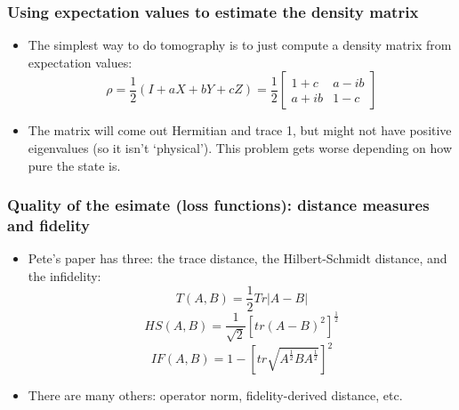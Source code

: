 \documentclass{beamer}
\begin{document}
\begin{frame}
  \frametitle{Using expectation values to estimate the density matrix}
  \begin{itemize}
  \item {The simplest way to do tomography is to just compute a density matrix from expectation values:
    \begin{equation}
      \rho = \frac{1}{2} (I + aX + bY + cZ) = \frac{1}{2}\begin{bmatrix} 1 + c & a - ib \\ a + ib & 1 -c\end{bmatrix}    
    \end{equation}
  }
\item The matrix will come out Hermitian and trace 1, but might not have positive eigenvalues (so it isn't `physical'). This problem gets worse depending on how pure the state is.
  \end{itemize}
\end{frame}

\begin{frame}
  \frametitle{Quality of the esimate (loss functions): distance measures and fidelity}
  \begin{itemize}
  \item{
      Pete's paper has three: the trace distance, the Hilbert-Schmidt distance, and the infidelity:
      \begin{equation}T(A,B) = \frac{1}{2} Tr|A - B|\end{equation}
      \begin{equation}HS(A,B) = \frac{1}{\sqrt{2}} \left[tr(A - B)^2\right]^{\frac{1}{2}}\end{equation}
      \begin{equation}IF(A,B) = 1 - \left[tr\sqrt{A^{\frac{1}{2}}BA^{\frac{1}{2}}}\right]^2\end{equation}
    }
  \item{There are many others: operator norm, fidelity-derived distance, etc.}
  \end{itemize}
\end{frame}
\end{document}
